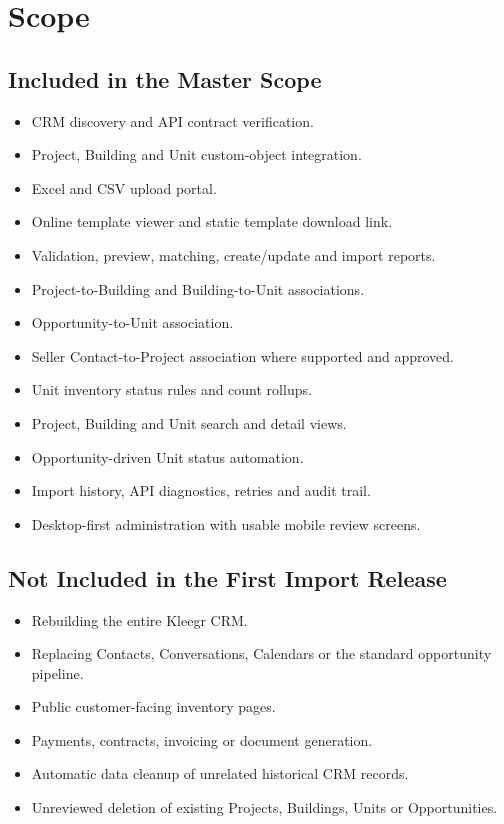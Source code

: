 \documentclass[10pt]{article}
\begin{document}
\section{Scope}
\subsection{Included in the Master Scope}
\begin{itemize}
\item CRM discovery and API contract verification.
\item Project, Building and Unit custom-object integration.
\item Excel and CSV upload portal.
\item Online template viewer and static template download link.
\item Validation, preview, matching, create/update and import reports.
\item Project-to-Building and Building-to-Unit associations.
\item Opportunity-to-Unit association.
\item Seller Contact-to-Project association where supported and approved.
\item Unit inventory status rules and count rollups.
\item Project, Building and Unit search and detail views.
\item Opportunity-driven Unit status automation.
\item Import history, API diagnostics, retries and audit trail.
\item Desktop-first administration with usable mobile review screens.
\end{itemize}

\subsection{Not Included in the First Import Release}
\begin{itemize}
\item Rebuilding the entire Kleegr CRM.
\item Replacing Contacts, Conversations, Calendars or the standard opportunity pipeline.
\item Public customer-facing inventory pages.
\item Payments, contracts, invoicing or document generation.
\item Automatic data cleanup of unrelated historical CRM records.
\item Unreviewed deletion of existing Projects, Buildings, Units or Opportunities.
\end{itemize}
\end{document}
